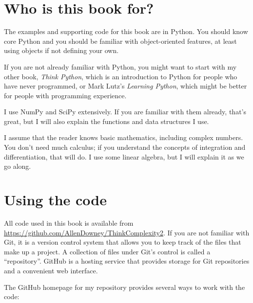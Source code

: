 \documentclass[12pt]{book}
\theoremstyle{exercise}
\begin{document}
\section{Who is this book for?}

The examples and supporting code for this book are in Python.  You
should know core Python and you should be
familiar with object-oriented features, at least using objects if not
defining your own.

If you are not already familiar with Python, you might want to start
with my other book, {\it Think Python}, which is an introduction to
Python for people who have never programmed, or Mark
Lutz's {\it Learning Python}, which might be better for people with
programming experience.

I use NumPy and SciPy extensively.  If you are familiar with them
already, that's great, but I will also explain the functions
and data structures I use.

I assume that the reader knows basic mathematics, including complex
numbers.  You don't need much calculus; if you understand the concepts
of integration and differentiation, that will do.
I use some linear algebra, but I will explain it as we
go along.


\section{Using the code}
\label{code}

All code used in this book is available from
\url{https://github.com/AllenDowney/ThinkComplexity2}.  
If you are not familiar with Git, it is a 
version control system that allows you to keep track of the files that
make up a project.  A collection of files under Git's control is
called a ``repository''.  GitHub is a hosting service that provides
storage for Git repositories and a convenient web interface.

  

The GitHub homepage for my repository provides several ways to
work with the code:
\end{document}
